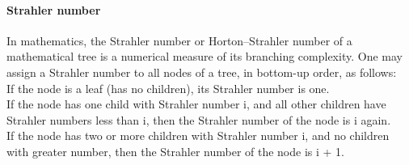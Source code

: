 \paragraph{Strahler number} In mathematics, the Strahler number or Horton–Strahler number of a mathematical tree is a numerical measure of its branching complexity. One may assign a Strahler number to all nodes of a tree, in bottom-up order, as follows:\\
If the node is a leaf (has no children), its Strahler number is one.\\
If the node has one child with Strahler number i, and all other children have Strahler numbers less than i, then the Strahler number of the node is i again.\\
If the node has two or more children with Strahler number i, and no children with greater number, then the Strahler number of the node is i + 1.


